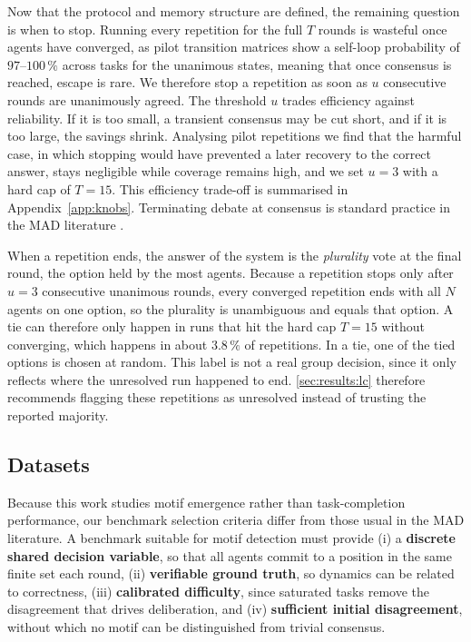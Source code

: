 Now that the protocol and memory structure are defined, the remaining question is when to stop.
Running every repetition for the full $T$ rounds is wasteful once agents have
converged, as pilot transition matrices show a self-loop probability of $97$--$100\,\%$ across tasks
for the unanimous states, meaning that once consensus is reached, escape is rare.
We therefore stop a repetition as soon as $u$ consecutive rounds are
unanimously agreed. The threshold $u$ trades efficiency against reliability. If it is too
small, a transient consensus may be cut short, and if it is too large, the savings
shrink. Analysing pilot repetitions we find that the harmful case, 
in which stopping would have prevented a later recovery to the
correct answer, stays negligible while coverage remains high, and we set $u = 3$
with a hard cap of $T = 15$. 
This efficiency trade-off is summarised in Appendix~\ref{app:knobs}.
Terminating debate at consensus is standard practice
in the \ac{MAD} literature \citep{yin2023eot, yang2025revisiting, kaesberg2025voting}.

When a repetition ends, the answer of the system is the \emph{plurality} vote
at the final round, the option held by the most agents. Because a repetition stops
only after $u = 3$ consecutive unanimous rounds, every converged repetition ends
with all $N$ agents on one option, so the plurality is unambiguous and equals that
option. A tie can therefore only happen in runs that hit the hard
cap $T = 15$ without converging, which happens in about $3.8\,\%$ of repetitions.
In a tie, one of the tied options is chosen at random. This label is not a real
group decision, since it only reflects where the unresolved run happened to end.
\autoref{sec:results:lc} therefore recommends flagging these repetitions as
unresolved instead of trusting the reported majority.

\subsection{Datasets}
\label{sec:setup:datasets}

Because this work studies motif emergence rather than task-completion
performance, our benchmark selection criteria differ from those usual in the \ac{MAD}
literature. A benchmark suitable for motif detection must provide (i) a
\textbf{discrete shared decision variable}, so that all agents commit to a
position in the same finite set each round, (ii) \textbf{verifiable ground truth},
so dynamics can be related to correctness, (iii) \textbf{calibrated difficulty},
since saturated tasks remove the disagreement that drives deliberation, and (iv)
\textbf{sufficient initial disagreement}, without which no motif can be
distinguished from trivial consensus.

